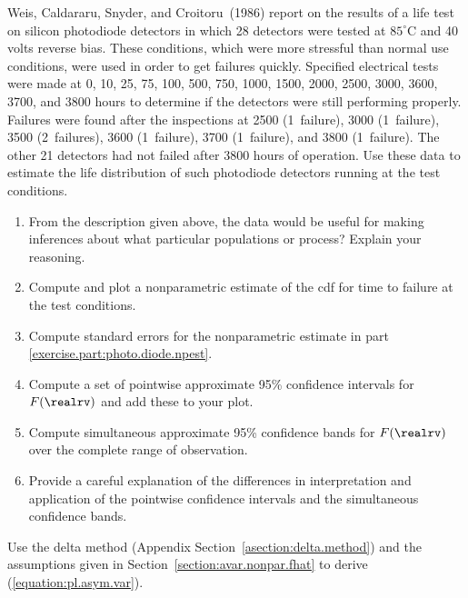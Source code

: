 \begin{exercise}
\label{exercise:weis.et.al.1986}
Weis, Caldararu, Snyder, and Croitoru~(1986) report on the results of
a life test on silicon photodiode detectors in which 28 detectors were
tested at
$85^\circ$C and 40 volts reverse bias. These conditions, which
were more stressful than normal use conditions, 
were used in order to get failures
quickly. Specified electrical tests were made at
0, 10, 25, 75, 100, 500, 750, 1000, 1500, 2000, 2500, 3000, 3600,
3700, and 3800 hours to determine if the detectors were still
performing properly. Failures were found after the inspections at
2500 (1~failure), 3000 (1~failure), 3500 (2~failures), 3600 
(1~failure), 3700 (1~failure), and 3800 (1~failure). The other 21
detectors had not failed after 3800 hours of operation.
Use these data to estimate the life distribution of 
such photodiode detectors running at the test conditions.
\begin{enumerate}
\item
From the description given above, the data would be useful
for making inferences about what particular populations or process?
Explain your reasoning.
\item
\label{exercise.part:photo.diode.npest}
Compute and plot a nonparametric estimate of the cdf for time
to failure at the test conditions.
\item
Compute standard errors for the nonparametric estimate in part
\ref{exercise.part:photo.diode.npest}.
\item
Compute a set of pointwise approximate 95\% confidence intervals for
$F(\realrv)$ and add these to your plot.
\item
Compute simultaneous approximate 95\% confidence bands for
$F(\realrv)$ over the complete range of observation.
\item
Provide a careful explanation of the differences in interpretation
and application of the pointwise confidence intervals and the
simultaneous confidence bands.
\end{enumerate}
\end{exercise}

\begin{exercise1}
Use the delta method (Appendix Section~\ref{asection:delta.method})
and the assumptions given in Section~\ref{section:avar.nonpar.fhat}
to derive (\ref{equation:pl.asym.var}).
\end{exercise1}

